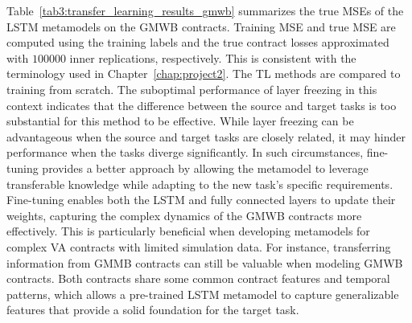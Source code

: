 Table~\ref{tab3:transfer_learning_results_gmwb} summarizes the true MSEs of the LSTM metamodels on the GMWB contracts.
Training MSE and true MSE are computed using the training labels and the true contract losses approximated with $\num{100000}$ inner replications, respectively.
This is consistent with the terminology used in Chapter~\ref{chap:project2}.
The TL methods are compared to training from scratch.
The suboptimal performance of layer freezing in this context indicates that the difference between the source and target tasks is too substantial for this method to be effective. 
While layer freezing can be advantageous when the source and target tasks are closely related, it may hinder performance when the tasks diverge significantly.
In such circumstances, fine-tuning provides a better approach by allowing the metamodel to leverage transferable knowledge while adapting to the new task's specific requirements. 
Fine-tuning enables both the LSTM and fully connected layers to update their weights, capturing the complex dynamics of the GMWB contracts more effectively.
This is particularly beneficial when developing metamodels for complex VA contracts with limited simulation data. 
For instance, transferring information from GMMB contracts can still be valuable when modeling GMWB contracts.
Both contracts share some common contract features and temporal patterns, which allows a pre-trained LSTM metamodel to capture generalizable features that provide a solid foundation for the target task.

